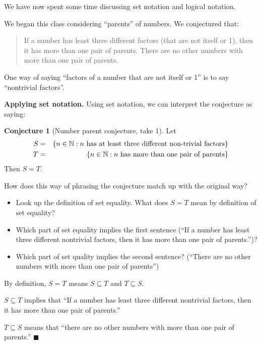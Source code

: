 \documentclass[11pt]{article}
\newenvironment{task}
	{\begin{mdframed}[linecolor=lightgray, linewidth=3pt]\raggedright}
	{\end{mdframed}}
\newcommand\tn{\textnormal}
\newcommand{\N}{\mathbb{N}}
\renewcommand\subset\subseteq
\newcommand\st{:}
\theoremstyle{definition}
\newtheorem{conjecture}[theorem]{Conjecture}
\newenvironment{solution}{{\it Solution.} }{\hfill {\color{lightgray}$\blacksquare$}}
\begin{document}
We have now spent some time discussing set notation and logical notation.

We began this class considering ``parents'' of numbers. We conjectured that:

\begin{quote}
If a number has least three different factors (that are not itself or 1), then it has more than one pair of parents. There are no other numbers with more than one pair of parents.
\end{quote}

One way of saying ``factors of a number that are not itself or 1'' is to say ``nontrivial factors''.

{\bf Applying set notation.} Using set notation, we can interpret the conjecture as saying:

\begin{conjecture}[Number parent conjecture, take 1]\label{c: number parent 1}
Let \begin{eqnarray*}
	S&=&\{ n\in \N\st n\tn{ has at least three different non-trivial factors}\} \\ 
	T&=&\{ n\in \N \st n \tn{ has more than one pair of parents}\} 
	\end{eqnarray*}
Then $S=T$.	
\end{conjecture}

\begin{task}
How does this way of phrasing the conjecture match up with the original way? 
	\begin{itemize}
	\item Look up the definition of set equality. What does $S=T$ mean by definition of set equality?
	\item Which part of set equality implies the first sentence (``If a number has least three different nontrivial factors, then it has more than one pair of parents.'')? 
	\item Which part of set quality implies the second sentence? (``There are no other numbers with more than one pair of parents'') 
	\end{itemize}
\end{task}

\begin{solution}
By definition, $S=T$ means $S\subset T$ and $T\subset S$.

$S\subset T$ implies that ``If a number has least three different nontrivial factors, then it has more than one pair of parents.''

$T\subset S$ means that ``there are no other numbers with more than one pair of parents.'' 
\end{solution}
\end{document}
